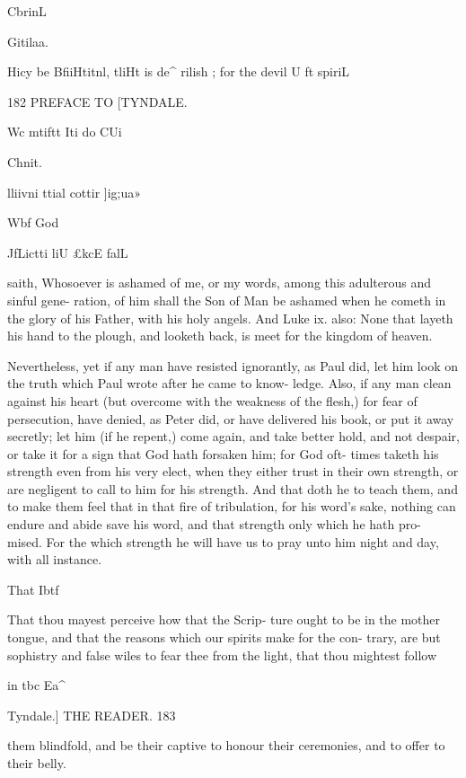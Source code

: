 \documentclass{custom}
\begin{document}
CbrinL 

Gitilaa. 

Hicy be 
BfiiHtitnl, 
tliHt is de^ 
rilish ; 
for the 
devil U ft 
spiriL 


182
PREFACE TO 
[TYNDALE.

Wc mtiftt 
Iti do CUi 

Chnit. 

lliivni ttial 
cottir ]ig;ua» 

Wbf God 

JfLictti liU 
£kcE falL 

saith, Whosoever is ashamed of me, or my
words, among this adulterous and sinful gene- 
ration, of him shall the Son of Man be ashamed 
when he cometh in the glory of his Father, with 
his holy angels. And Luke ix. also: None 
that layeth his hand to the plough, and looketh 
back, is meet for the kingdom of heaven.

Nevertheless, yet if any man have resisted 
ignorantly, as Paul did, let him look on the 
truth which Paul wrote after he came to know- 
ledge. Also, if any man clean against his heart 
(but overcome with the weakness of the flesh,) 
for fear of persecution, have denied, as Peter 
did, or have delivered his book, or put it away 
secretly; let him (if he repent,) come again, and 
take better hold, and not despair, or take it for a 
sign that God hath forsaken him; for God oft- 
times taketh his strength even from his very elect, 
when they either trust in their own strength, or 
are negligent to call to him for his strength. And 
that doth he to teach them, and to make them 
feel that in that fire of tribulation, for his word's 
sake, nothing can endure and abide save his 
word, and that strength only which he hath pro- 
mised. For the which strength he will have us to 
pray unto him night and day, with all instance. 

That Ibtf 

That thou mayest perceive how that the Scrip- 
ture ought to be in the mother tongue, and that 
the reasons which our spirits make for the con- 
trary, are but sophistry and false wiles to fear 
thee from the light, that thou mightest follow 

in tbc Ea^ 


Tyndale.] 
THE READER. 
183

them blindfold, and be their captive to honour 
their ceremonies, and to offer to their belly. 
\end{document}
